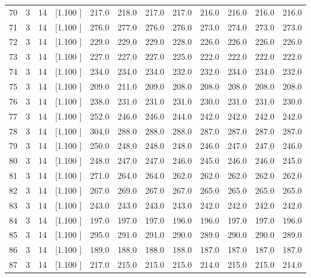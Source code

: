 \documentclass[12pt,a4paper]{article}
\begin{document}
\begin{center}
{\begin{tabular}{r r r r r r r r r r r r}
  70&  3& 14&[1.100     ]&   217.0&   218.0&   217.0&   217.0&   216.0&   216.0&   216.0&   216.0\\[-0.02in]
  71&  3& 14&[1.100     ]&   276.0&   277.0&   276.0&   276.0&   273.0&   274.0&   273.0&   273.0\\[-0.02in]
  72&  3& 14&[1.100     ]&   229.0&   229.0&   229.0&   228.0&   226.0&   226.0&   226.0&   226.0\\[-0.02in]
  73&  3& 14&[1.100     ]&   227.0&   227.0&   227.0&   225.0&   222.0&   222.0&   222.0&   222.0\\[-0.02in]
  74&  3& 14&[1.100     ]&   234.0&   234.0&   234.0&   232.0&   232.0&   234.0&   234.0&   232.0\\[-0.02in]
  75&  3& 14&[1.100     ]&   209.0&   211.0&   209.0&   208.0&   208.0&   208.0&   208.0&   208.0\\[-0.02in]
  76&  3& 14&[1.100     ]&   238.0&   231.0&   231.0&   231.0&   230.0&   231.0&   231.0&   230.0\\[-0.02in]
  77&  3& 14&[1.100     ]&   252.0&   246.0&   246.0&   244.0&   242.0&   242.0&   242.0&   242.0\\[-0.02in]
  78&  3& 14&[1.100     ]&   304.0&   288.0&   288.0&   288.0&   287.0&   287.0&   287.0&   287.0\\[-0.02in]
  79&  3& 14&[1.100     ]&   250.0&   248.0&   248.0&   248.0&   246.0&   247.0&   247.0&   246.0\\[-0.02in]
  80&  3& 14&[1.100     ]&   248.0&   247.0&   247.0&   246.0&   245.0&   246.0&   246.0&   245.0\\[-0.02in]
  81&  3& 14&[1.100     ]&   271.0&   264.0&   264.0&   262.0&   262.0&   262.0&   262.0&   262.0\\[-0.02in]
  82&  3& 14&[1.100     ]&   267.0&   269.0&   267.0&   267.0&   265.0&   265.0&   265.0&   265.0\\[-0.02in]
  83&  3& 14&[1.100     ]&   243.0&   243.0&   243.0&   243.0&   242.0&   242.0&   242.0&   242.0\\[-0.02in]
  84&  3& 14&[1.100     ]&   197.0&   197.0&   197.0&   196.0&   196.0&   197.0&   197.0&   196.0\\[-0.02in]
  85&  3& 14&[1.100     ]&   295.0&   291.0&   291.0&   290.0&   289.0&   290.0&   290.0&   289.0\\[-0.02in]
  86&  3& 14&[1.100     ]&   189.0&   188.0&   188.0&   188.0&   187.0&   187.0&   187.0&   187.0\\[-0.02in]
  87&  3& 14&[1.100     ]&   217.0&   215.0&   215.0&   215.0&   214.0&   215.0&   215.0&   214.0\\[-0.02in]

\end{tabular}}
\end{center}
\end{document}
